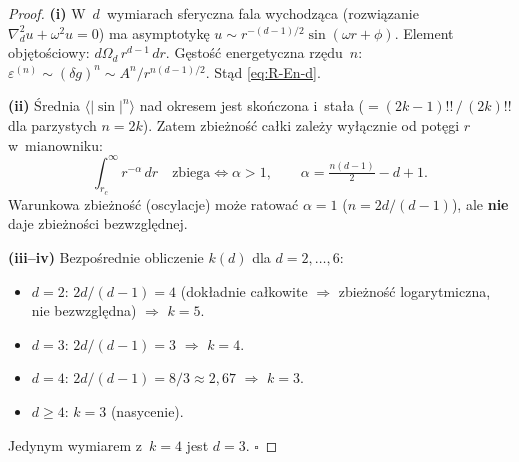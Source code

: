 \begin{proof}
\textbf{(i)} W~$d$~wymiarach sferyczna fala wychodz\k{a}ca
(rozwi\k{a}zanie $\nabla^2_d u + \omega^2 u = 0$)
ma asymptotyk\k{e} $u \sim r^{-(d-1)/2}\sin(\omega r + \phi)$.
Element obj\k{e}to\'sciowy: $d\Omega_d\,r^{d-1}\,dr$.
G\k{e}sto\'s\'c energetyczna rz\k{e}du~$n$:
$\varepsilon^{(n)} \sim (\delta g)^n \sim A^n / r^{n(d-1)/2}$.
St\k{a}d \eqref{eq:R-En-d}.

\medskip\noindent
\textbf{(ii)} \'Srednia $\langle|\sin|^n\rangle$ nad okresem jest
sko\'nczona i~stała ($= (2k-1)!!\,/\,(2k)!!$ dla parzystych $n = 2k$).
Zatem zbie\.zno\'s\'c ca\l{}ki zale\.zy wy\l{}\k{a}cznie
od pot\k{e}gi $r$ w~mianowniku:
\begin{equation}
  \int_{r_c}^{\infty}\! r^{-\alpha}\,dr \quad\text{zbiega}
  \iff \alpha > 1,
  \qquad
  \alpha = \tfrac{n(d-1)}{2} - d + 1.
\end{equation}
Warunkowa zbie\.zno\'s\'c (oscylacje) mo\.ze ratowa\'c
$\alpha = 1$ ($n = 2d/(d-1)$), ale \textbf{nie} daje
zbie\.zno\'sci bezwzgl\k{e}dnej.

\medskip\noindent
\textbf{(iii--iv)} Bezpo\'srednie obliczenie $k(d)$ dla $d = 2, \ldots, 6$:
\begin{itemize}[nosep]
  \item $d = 2$: $2d/(d-1) = 4$ (dok\l{}adnie ca\l{}kowite
    $\Rightarrow$ zbie\.zno\'s\'c logarytmiczna, nie bezwzgl\k{e}dna)
    $\Rightarrow$ $k = 5$.
  \item $d = 3$: $2d/(d-1) = 3$ $\Rightarrow$ $k = 4$.
  \item $d = 4$: $2d/(d-1) = 8/3 \approx 2{,}67$ $\Rightarrow$ $k = 3$.
  \item $d \geq 4$: $k = 3$ (nasycenie).
\end{itemize}
Jedynym wymiarem z~$k = 4$ jest $d = 3$.
\hfill$\square$
\end{proof}

